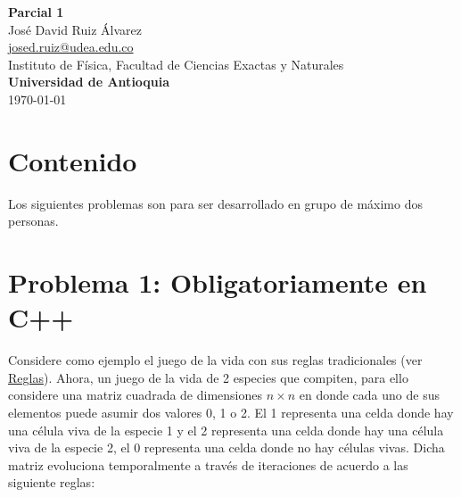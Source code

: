 \documentclass[10.5pt]{article}
\begin{document}
\noindent
\begin{minipage}[b]{0.75\linewidth}
{\LARGE\bf Parcial 1}\\ %
\large{Jos\'{e} David Ruiz \'{A}lvarez} \\
\small{\href{mailto:josed.ruiz@udea.edu.co}{josed.ruiz@udea.edu.co}} \\ %
\normalsize{Instituto de Física, Facultad de Ciencias Exactas y Naturales} \\%
\normalsize{\bf Universidad de Antioquia} \\[8mm]
\today %
\end{minipage}%

\section{Contenido}

Los siguientes problemas son para ser desarrollado en grupo de m\'{a}ximo dos personas. 

\section{Problema 1: Obligatoriamente en C++}

Considere como ejemplo el juego de la vida con sus reglas tradicionales (ver \href{https://es.wikipedia.org/wiki/Juego_de_la_vida#El_juego}{Reglas}). Ahora, un juego de la vida de 2 especies que compiten, para ello considere una matriz cuadrada de dimensiones $n \times n$ en donde cada uno de sus elementos puede asumir dos valores 0, 1 o 2. El 1 representa una celda donde hay una célula viva de la especie 1 y el 2 representa una celda donde hay una célula viva de la especie 2, el 0 representa una celda donde no hay células vivas. Dicha matriz evoluciona temporalmente a trav\'{e}s de iteraciones de acuerdo a las siguiente reglas:
\end{document}
